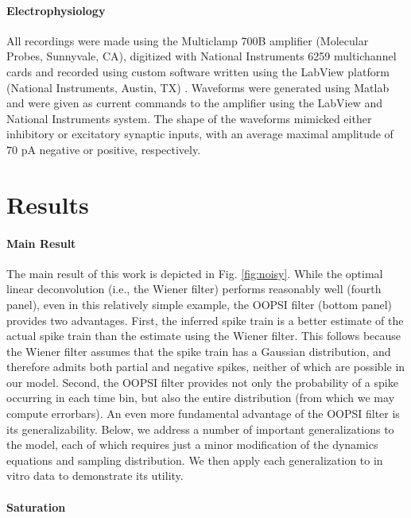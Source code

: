 \documentclass[12pt]{article}
\begin{document}
\paragraph{Electrophysiology}

All recordings were made using the Multiclamp 700B amplifier (Molecular Probes, Sunnyvale, CA), digitized with National Instruments 6259 multichannel cards and recorded using custom software written using the LabView platform (National Instruments, Austin, TX) .  Waveforms were generated using Matlab and were given as current commands to the amplifier using the LabView and National Instruments system. The shape of the waveforms mimicked either inhibitory or excitatory synaptic inputs, with an average maximal amplitude of $70$ pA negative or positive, respectively.

\section*{Results} \label{sec:results}

\paragraph{Main Result}

The main result of this work is depicted in Fig. \ref{fig:noisy}. While the optimal linear deconvolution (i.e., the Wiener filter) performs reasonably well (fourth panel), even in this relatively simple example, the OOPSI filter (bottom panel) provides two advantages.  First, the inferred spike train is a better estimate of the actual spike train than the estimate using the Wiener filter. This follows because the Wiener filter assumes that the spike train has a Gaussian distribution, and therefore admits both partial and negative spikes, neither of which are possible in our model. Second, the OOPSI filter provides not only the probability of a spike occurring in each time bin, but also the entire distribution (from which we may compute errorbars). An even more fundamental advantage of the OOPSI filter is its generalizability. Below, we address a number of important generalizations to the model, each of which requires just a minor modification of the dynamics equations and sampling distribution. We then apply each generalization to in vitro data to demonstrate its utility.


\paragraph{Saturation}
\end{document}
